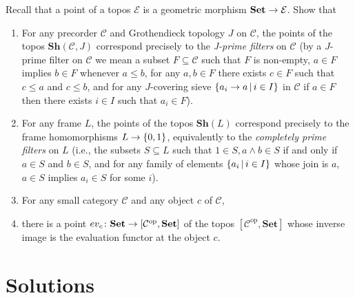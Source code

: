 \documentclass[a4paper]{article}
\begin{document}
\begin{snippetexercise}{}
    Recall that a point of a topos \(\mathcal E\)
    is a geometric morphism \(\mathbf{Set} \to \mathcal E\).
    Show that
    \begin{enumerate}[label=\Alph*]
        \item For any precorder \(\mathcal C\) and Grothendieck topology \(J\)
        on \(\mathcal C\), the points of the topos \(\mathbf{Sh}(\mathcal C, J)\) correspond
        precisely to the \emph{J-prime filters} on \(\mathcal C\) (by a \(J\)-prime filter
        on \(\mathcal C\) we mean a subset \(F\subseteq \mathcal C\) such that \(F\) is non-empty,
        \(a \in F\) implies \(b\in F\) whenever \(a\leq b\), for any \(a,b \in F\) there exists
        \(c\in F\) such that \(c \leq a\) and \(c\leq b\), and for any \(J\)-covering sieve
        \(\{a_i \to a \,|\, i \in I\}\) in \(\mathcal C\) if
        \(a \in F\) then there exists \(i\in I\) such that \(a_i \in F\)).
        \item For any frame \(L\), the points of the topos
        \(\mathbf{Sh}(L)\) correspond precisely to the frame homomorphisms
        \(L \to \{0,1\}\), equivalently to the \emph{completely prime filters}
        on \(L\) (i.e., the subsets \(S \subseteq L\) such that \(1 \in S, a \land b \in S\) if
        and only if \(a \in S\) and \(b \in S\), and for any family of elements
        \(\{a_i \,|\, i\in I\}\) whose join is \(a\), \(a \in S\) implies \(a_i \in S\) for
        some \(i\)).
        \item For any small category \(\mathcal C\) and any object \(c\) of \(\mathcal C\),
        \item there is a point \(ev_c \colon \mathbf{Set} \to [\mathcal C^{\text{op}}, \mathbf{Set}]\)
        of the topos \([\mathcal C^{\text{op}}, \mathbf{Set}]\) whose inverse image is the evaluation
        functor at the object \(c\).
    \end{enumerate}
\end{snippetexercise}

\section{Solutions}
\end{document}
